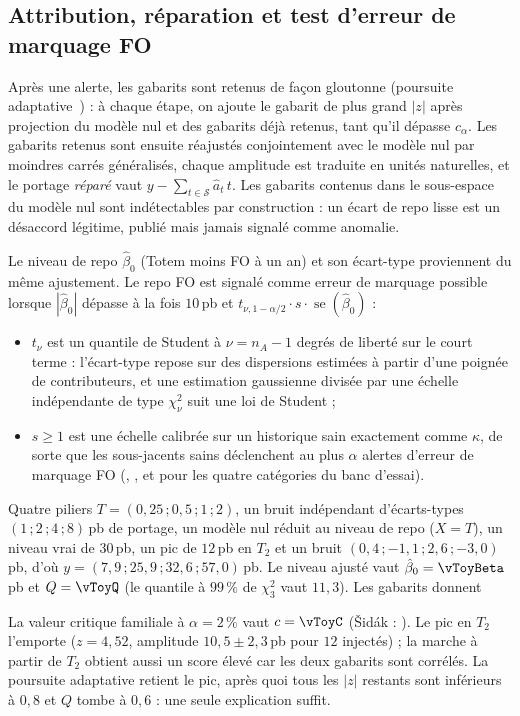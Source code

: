 \subsection{Attribution, réparation et test d'erreur de marquage FO}
Après une alerte, les gabarits sont retenus de façon gloutonne (poursuite adaptative~\cite{mallat1993}) : à chaque
étape, on ajoute le gabarit de plus grand $|z|$ après projection du modèle nul et des gabarits déjà retenus, tant qu'il
dépasse $c_\alpha$. Les gabarits retenus sont ensuite réajustés conjointement avec le modèle nul par moindres carrés
généralisés, chaque amplitude est traduite en unités naturelles, et le portage \emph{réparé} vaut
$y-\sum_{t\in\mathcal S}\hat a_t\,t$. Les gabarits contenus dans le sous-espace du modèle nul sont indétectables par
construction : un écart de repo lisse est un désaccord légitime, publié mais jamais signalé comme anomalie.

Le niveau de repo $\hat\beta_0$ (Totem moins FO à un an) et son écart-type proviennent du même ajustement. Le repo FO est
signalé comme erreur de marquage possible lorsque $|\hat\beta_0|$ dépasse à la fois $10$\,pb et
$t_{\nu,1-\alpha/2}\cdot s\cdot\operatorname{se}(\hat\beta_0)$ :
\begin{itemize}
\item $t_\nu$ est un quantile de Student à $\nu=n_A-1$ degrés de liberté sur le court terme : l'écart-type repose sur des
dispersions estimées à partir d'une poignée de contributeurs, et une estimation gaussienne divisée par une échelle
indépendante de type $\chi^2_\nu$ suit une loi de Student ;
\item $s\ge1$ est une échelle calibrée sur un historique sain exactement comme $\kappa$, de sorte que les sous-jacents
sains déclenchent au plus $\alpha$ alertes d'erreur de marquage FO (\vLevelScaleEuStock, \vLevelScaleUsStock,
\vLevelScaleHtb{} et \vLevelScaleIndex{} pour les quatre catégories du banc d'essai).
\end{itemize}

\begin{example}\label{ex-toy}
Quatre piliers $T=(0{,}25\,;0{,}5\,;1\,;2)$, un bruit indépendant d'écarts-types $(1\,;2\,;4\,;8)$\,pb de portage, un modèle
nul réduit au niveau de repo ($X=T$), un niveau vrai de $30$\,pb, un pic de $12$\,pb en $T_2$ et un bruit
$(0{,}4\,;-1{,}1\,;2{,}6\,;-3{,}0)$\,pb, d'où $y=(7{,}9\,;25{,}9\,;32{,}6\,;57{,}0)$\,pb. Le niveau ajusté vaut
$\hat\beta_0=\vToyBeta$\,pb et $Q=\vToyQ$ (le quantile à $99\,\%$ de $\chi^2_3$ vaut $11{,}3$). Les \vToyM{} gabarits donnent
\begin{center}\end{center}
La valeur critique familiale à $\alpha=2\,\%$ vaut $c=\vToyC$ (Šidák : \vToyCsidak). Le pic en $T_2$ l'emporte
($z=4{,}52$, amplitude $10{,}5\pm2{,}3$\,pb pour $12$ injectés) ; la marche à partir de $T_2$ obtient aussi un score élevé car
les deux gabarits sont corrélés. La poursuite adaptative retient le pic, après quoi tous les $|z|$ restants sont inférieurs
à $0{,}8$ et $Q$ tombe à $0{,}6$ : une seule explication suffit.
\end{example}

